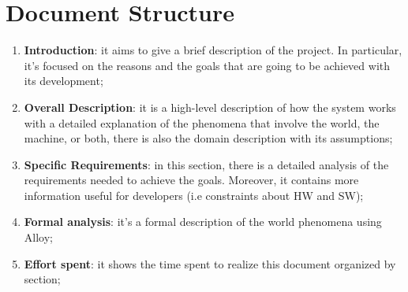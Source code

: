 \pagebreak
\section{Document Structure}

\begin{enumerate}
    \item  \textbf{Introduction}: it aims to give a brief description of the project. In particular, it’s focused on the reasons and the goals that are going to be achieved with its development;
 
    \item \textbf{Overall Description}: it is a high-level description of how the system works with a detailed explanation of the phenomena that involve the world, the machine, or both, there is also the domain description with its assumptions;
 
    \item \textbf{Specific Requirements}: in this section, there is a detailed analysis of the requirements needed to achieve the goals. Moreover, it contains more information useful for developers (i.e constraints about HW and SW);
    
    \item \textbf{Formal analysis}: it’s a formal description of the world phenomena using Alloy;

    \item  \textbf{Effort spent}: it shows the time spent to realize this document organized by section;
    
\end{enumerate}